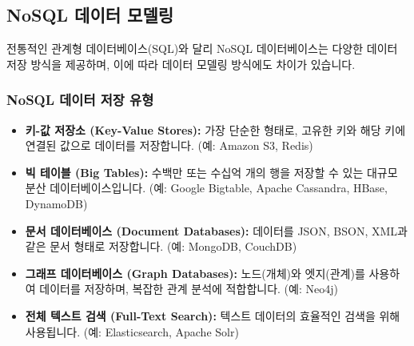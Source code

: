 \documentclass[11pt,a4paper]{article}
\begin{document}
\subsection{NoSQL 데이터 모델링}
전통적인 관계형 데이터베이스(SQL)와 달리 NoSQL 데이터베이스는 다양한 데이터 저장 방식을 제공하며, 이에 따라 데이터 모델링 방식에도 차이가 있습니다.

\subsubsection{NoSQL 데이터 저장 유형}
\begin{itemize}
    \item \textbf{키-값 저장소 (Key-Value Stores):} 가장 단순한 형태로, 고유한 키와 해당 키에 연결된 값으로 데이터를 저장합니다. (예: Amazon S3, Redis)
    \item \textbf{빅 테이블 (Big Tables):} 수백만 또는 수십억 개의 행을 저장할 수 있는 대규모 분산 데이터베이스입니다. (예: Google Bigtable, Apache Cassandra, HBase, DynamoDB)
    \item \textbf{문서 데이터베이스 (Document Databases):} 데이터를 JSON, BSON, XML과 같은 문서 형태로 저장합니다. (예: MongoDB, CouchDB)
    \item \textbf{그래프 데이터베이스 (Graph Databases):} 노드(개체)와 엣지(관계)를 사용하여 데이터를 저장하며, 복잡한 관계 분석에 적합합니다. (예: Neo4j)
    \item \textbf{전체 텍스트 검색 (Full-Text Search):} 텍스트 데이터의 효율적인 검색을 위해 사용됩니다. (예: Elasticsearch, Apache Solr)
\end{itemize}
\end{document}
